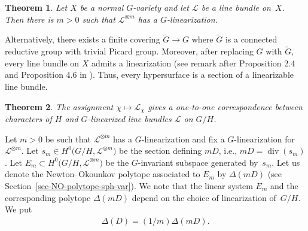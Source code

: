 \documentclass[pdftex]{sigma}
\numberwithin{equation}{section}
\newtheorem{Th}{Theorem}[section]
\theoremstyle{definition}
\begin{document}
\begin{Th} \label{th-exist-G-lin}
Let $X$ be a normal $G$-variety and let $\mathcal{L}$ be a line bundle on~$X$. Then there is $m>0$ such that $\mathcal{L}^{\otimes m}$ has a $G$-linearization.
\end{Th}

Alternatively, there exists a finite covering $\tilde{G} \to G$ where $\tilde{G}$ is a connected reductive group with trivial Picard group. Moreover, after replacing $G$ with $\tilde{G}$, every line bundle on $X$ admits a linearization (see remark after Proposition 2.4 and Proposition 4.6 in \cite{KKLV}). Thus, every hypersurface is a section of a linearizable line bundle.

\begin{Th} \label{th-G-lin-G/H}
The assignment $\chi \mapsto \mathcal{L}_\chi$ gives a one-to-one correspondence between characters of $H$ and $G$-linearized line bundles $\mathcal{L}$ on $G/H$.
\end{Th}

Let $m>0$ be such that ${\mathcal L}^{\otimes m}$ has a $G$-linearization and fix a $G$-linearization for ${\mathcal L}^{\otimes m}$. Let $s_m \in H^0\big(G/H, {\mathcal L}^{\otimes m}\big)$ be the section defining $mD$, i.e., $mD = \operatorname{div}(s_m)$. Let $E_m \subset H^0\big(G/H, {\mathcal L}^{\otimes m}\big)$ be the $G$-invariant subspace generated by~$s_m$. Let us denote the Newton--Okounkov polytope associated to $E_m$ by $\Delta(mD)$ (see Section~\ref{sec-NO-polytope-sph-var}). We note that the linear system $E_m$ and the corresponding polytope $\Delta(mD)$ depend on the choice of linearization of~$G/H$. We put
\begin{gather*} \Delta(D) = (1/m) \Delta(mD).\end{gather*}
\end{document}
